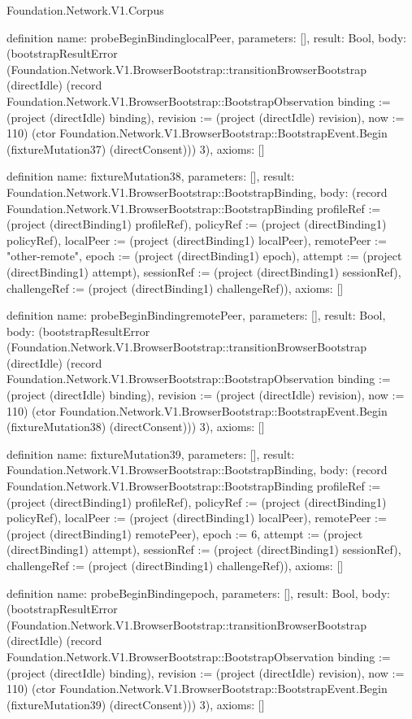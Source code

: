 \begin{lexlean}{Foundation.Network.V1.Corpus}
\begin{semanticmodule}
definition{
  name: probeBeginBindinglocalPeer,
  parameters: [],
  result: Bool,
  body: (bootstrapResultError (Foundation.Network.V1.BrowserBootstrap::transitionBrowserBootstrap (directIdle) (record Foundation.Network.V1.BrowserBootstrap::BootstrapObservation {binding := (project (directIdle) binding), revision := (project (directIdle) revision), now := 110}) (ctor Foundation.Network.V1.BrowserBootstrap::BootstrapEvent.Begin (fixtureMutation37) (directConsent))) 3),
  axioms: []
}

definition{
  name: fixtureMutation38,
  parameters: [],
  result: Foundation.Network.V1.BrowserBootstrap::BootstrapBinding,
  body: (record Foundation.Network.V1.BrowserBootstrap::BootstrapBinding {profileRef := (project (directBinding1) profileRef), policyRef := (project (directBinding1) policyRef), localPeer := (project (directBinding1) localPeer), remotePeer := "other-remote", epoch := (project (directBinding1) epoch), attempt := (project (directBinding1) attempt), sessionRef := (project (directBinding1) sessionRef), challengeRef := (project (directBinding1) challengeRef)}),
  axioms: []
}

definition{
  name: probeBeginBindingremotePeer,
  parameters: [],
  result: Bool,
  body: (bootstrapResultError (Foundation.Network.V1.BrowserBootstrap::transitionBrowserBootstrap (directIdle) (record Foundation.Network.V1.BrowserBootstrap::BootstrapObservation {binding := (project (directIdle) binding), revision := (project (directIdle) revision), now := 110}) (ctor Foundation.Network.V1.BrowserBootstrap::BootstrapEvent.Begin (fixtureMutation38) (directConsent))) 3),
  axioms: []
}

definition{
  name: fixtureMutation39,
  parameters: [],
  result: Foundation.Network.V1.BrowserBootstrap::BootstrapBinding,
  body: (record Foundation.Network.V1.BrowserBootstrap::BootstrapBinding {profileRef := (project (directBinding1) profileRef), policyRef := (project (directBinding1) policyRef), localPeer := (project (directBinding1) localPeer), remotePeer := (project (directBinding1) remotePeer), epoch := 6, attempt := (project (directBinding1) attempt), sessionRef := (project (directBinding1) sessionRef), challengeRef := (project (directBinding1) challengeRef)}),
  axioms: []
}

definition{
  name: probeBeginBindingepoch,
  parameters: [],
  result: Bool,
  body: (bootstrapResultError (Foundation.Network.V1.BrowserBootstrap::transitionBrowserBootstrap (directIdle) (record Foundation.Network.V1.BrowserBootstrap::BootstrapObservation {binding := (project (directIdle) binding), revision := (project (directIdle) revision), now := 110}) (ctor Foundation.Network.V1.BrowserBootstrap::BootstrapEvent.Begin (fixtureMutation39) (directConsent))) 3),
  axioms: []
}


\end{semanticmodule}
\end{lexlean}
